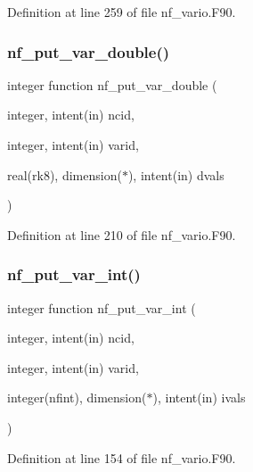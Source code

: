 Definition at line 259 of file nf\+\_\+vario.\+F90.

\mbox{\label{nf__vario_8F90_a64f5364aa86cc599ddf5af66097135fb}} 
\subsubsection{\texorpdfstring{nf\+\_\+put\+\_\+var\+\_\+double()}{nf\_put\_var\_double()}}
{\footnotesize\ttfamily integer function nf\+\_\+put\+\_\+var\+\_\+double (\begin{DoxyParamCaption}\item[{integer, intent(in)}]{ncid,  }\item[{integer, intent(in)}]{varid,  }\item[{real(rk8), dimension($\ast$), intent(in)}]{dvals }\end{DoxyParamCaption})}



Definition at line 210 of file nf\+\_\+vario.\+F90.

\mbox{\label{nf__vario_8F90_a72a906ed700444202359dcf3c88b1e8c}} 
\subsubsection{\texorpdfstring{nf\+\_\+put\+\_\+var\+\_\+int()}{nf\_put\_var\_int()}}
{\footnotesize\ttfamily integer function nf\+\_\+put\+\_\+var\+\_\+int (\begin{DoxyParamCaption}\item[{integer, intent(in)}]{ncid,  }\item[{integer, intent(in)}]{varid,  }\item[{integer(nfint), dimension($\ast$), intent(in)}]{ivals }\end{DoxyParamCaption})}



Definition at line 154 of file nf\+\_\+vario.\+F90.

\mbox{\label{nf__vario_8F90_a6eaf0723d97365848a4c50ce8e068583}} 
